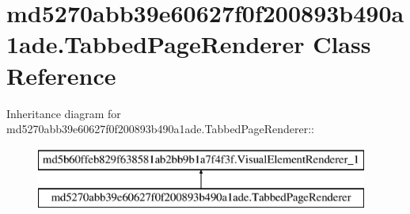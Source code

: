 \hypertarget{classmd5270abb39e60627f0f200893b490a1ade_1_1_tabbed_page_renderer}{
\section{md5270abb39e60627f0f200893b490a1ade.TabbedPageRenderer Class Reference}
\label{classmd5270abb39e60627f0f200893b490a1ade_1_1_tabbed_page_renderer}
}
Inheritance diagram for md5270abb39e60627f0f200893b490a1ade.TabbedPageRenderer::\begin{figure}[H]
\begin{center}
\leavevmode
\includegraphics[height=2cm]{classmd5270abb39e60627f0f200893b490a1ade_1_1_tabbed_page_renderer}
\end{center}
\end{figure}
